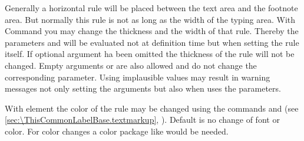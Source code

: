 \begin{Declaration}
\end{Declaration}%
Generally%
a horizontal rule will be placed between the text area and the footnote
area. But normally this rule is not as long as the width of the typing
area. With Command  you may change the thickness and
the width of that rule. Thereby the parameters  and
 will be evaluated not at definition time but when setting the
rule itself. If optional argument  ha been omitted the
thickness of the rule will not be changed. Empty arguments 
or  are also allowed and do not change the corresponding
parameter. Using implausible values may result in warning messages not only
setting the arguments but also when \KOMAScript{} uses the parameters.

\BeginIndexGroup
{}%
With element 
the color%
of the rule may be changed using the commands
 and
 (see
\autoref{sec:\ThisCommonLabelBase.textmarkup},
). Default is no change
of font or color. For color changes a color package like
 would be
needed.%
%
\EndIndexGroup
\EndIndexGroup
%
\EndIndexGroup


